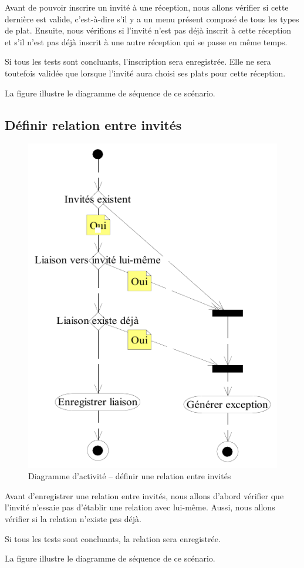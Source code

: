 Avant de pouvoir inscrire un invité à une réception, nous allons vérifier si cette dernière est valide, c'est-à-dire s'il y a un menu présent composé de tous les types de plat. Ensuite, nous vérifions si l'invité n'est pas déjà inscrit à cette réception et s'il n'est pas déjà inscrit à une autre réception qui se passe en même temps.

Si tous les tests sont concluants, l'inscription sera enregistrée. Elle ne sera toutefois validée que lorsque l'invité aura choisi ses plats pour cette réception.

La figure  illustre le diagramme de séquence de ce scénario.

\subsection{Définir relation entre invités}

\begin{figure}
  \centering
  \includegraphics[scale=.88]{IMG/da_definir_relation_entre_invites}
  \caption{Diagramme d'activité -- définir une relation entre invités}
  \label{img_da_definir_relation_entre_invites}
\end{figure}

Avant d'enregistrer une relation entre invités, nous allons d'abord vérifier que l'invité n'essaie pas d'établir une relation avec lui-même. Aussi, nous allons vérifier si la relation n'existe pas déjà.

Si tous les tests sont concluants, la relation sera enregistrée.

La figure  illustre le diagramme de séquence de ce scénario.
